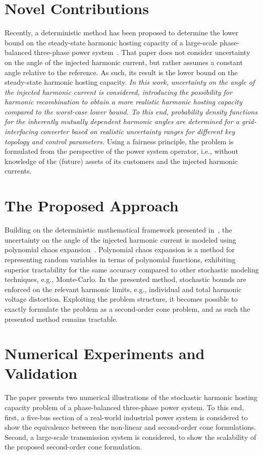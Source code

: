 \documentclass{IEEEtran4PSCC}
\begin{document}
\section{Novel Contributions}
Recently, a deterministic method has been proposed to determine the lower bound on the steady-state harmonic hosting capacity of a large-scale phase-balanced three-phase power system~\cite{tom_van_acker_exact_nodate}. That paper does not consider uncertainty on the angle of the injected harmonic current, but rather assumes a constant angle relative to the reference. As such, its result is the lower bound on the steady-state harmonic hosting capacity. \textit{In this work, uncertainty on the angle of the injected harmonic current is considered, introducing the possibility for harmonic recombination to obtain a more realistic harmonic hosting capacity compared to the worst-case lower bound. To this end, probability density functions for the inherently mutually dependent harmonic angles are determined for a grid-interfacing converter based on realistic uncertainty ranges for different key topology and control parameters.} Using a fairness principle, the problem is formulated from the perspective of the power system operator, i.e., without knowledge of the (future) assets of its customers and the injected harmonic currents.

\section{The Proposed Approach}

Building on the deterministic mathematical framework presented in~\cite{tom_van_acker_exact_nodate}, the uncertainty on the angle of the injected harmonic current is modeled using polynomial chaos expansion~\cite{sullivan_introduction_2015}. Polynomial chaos expansion is a method for representing random variables in terms of polynomial functions, exhibiting superior tractability for the same accuracy compared to other stochastic modeling techniques, e.g., Monte-Carlo. In the presented method, stochastic bounds are enforced on the relevant harmonic limits, e.g., individual and total harmonic voltage distortion. Exploiting the problem structure, it becomes possible to exactly formulate the problem as a second-order cone problem, and as such the presented method remains tractable. 

\section{Numerical Experiments and Validation}

The paper presents two numerical illustrations of the stochastic harmonic hosting capacity problem of a phase-balanced three-phase power system. To this end, first, a five-bus section of a real-world industrial power system is considered to show the equivalence between the non-linear and second-order cone formulations. Second, a large-scale transmission system is
considered, to show the scalability of the proposed second-order cone formulation. 



\end{document}
